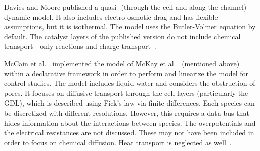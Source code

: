 Davies and Moore published a quasi- (through-the-cell and along-the-channel) dynamic  model. %
It also includes electro-osmotic drag and has flexible assumptions, but it is isothermal.  The model uses the Butler-Volmer equation by default.  The catalyst layers of the published version do not include chemical transport---only reactions and charge transport~\cite{Davies2007ElectrochemSocT, Davies2007FCSeminar}.


McCain et al.~\cite{McCain2006} implemented the model of McKay et al.~\cite{McKay2005} (mentioned above) within a declarative framework in order to perform  and linearize the model for control studies.  The model includes liquid water and considers the obstruction of pores.  It focuses on  diffusive transport through the cell layers (particularly the GDL), which is described using Fick's law via finite differences.  Each species can be discretized with different resolutions.  However, this requires a data bus that hides information about the interactions between species.  The overpotentials and the electrical resistances are not discussed.  These may not have been included in order to focus on chemical diffusion.  Heat transport is neglected as well~\cite{McCain2006}.

